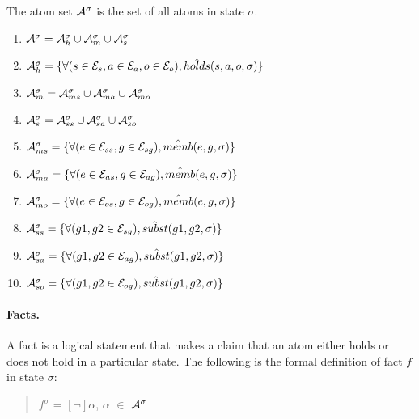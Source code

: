 \documentclass[10pt, twocolumn]{article}
\begin{document}
          The atom set ${\cal A}^{\sigma}$ is the set of all atoms in state
          $\sigma$. 

          \begin{enumerate}
            \item
              ${\cal A}^{\sigma} = {\cal A}^{\sigma}_{h} \cup {\cal A}^{\sigma}_{m} \cup {\cal A}^{\sigma}_{s}$
            \item
              ${\cal A}^{\sigma}_{h} = \{\forall (s \in {\cal E}_{s}, a \in {\cal E}_{a}, o \in {\cal E}_{o}), \hat{holds}(s, a, o, \sigma) \}$
            \item
              ${\cal A}^{\sigma}_{m} = {\cal A}^{\sigma}_{ms} \cup {\cal A}^{\sigma}_{ma} \cup {\cal A}^{\sigma}_{mo}$
            \item
              ${\cal A}^{\sigma}_{s} = {\cal A}^{\sigma}_{ss} \cup {\cal A}^{\sigma}_{sa} \cup {\cal A}^{\sigma}_{so}$
            \item
              ${\cal A}^{\sigma}_{ms} = \{\forall (e \in {\cal E}_{ss}, g \in {\cal E}_{sg}), \hat{memb}(e, g, \sigma)\}$
            \item
              ${\cal A}^{\sigma}_{ma} = \{\forall (e \in {\cal E}_{as}, g \in {\cal E}_{ag}), \hat{memb}(e, g, \sigma)\}$
            \item
              ${\cal A}^{\sigma}_{mo} = \{\forall (e \in {\cal E}_{os}, g \in {\cal E}_{og}), \hat{memb}(e, g, \sigma)\}$
            \item
              ${\cal A}^{\sigma}_{ss} = \{\forall (g1, g2 \in {\cal E}_{sg}), \hat{subst}(g1, g2, \sigma)\}$
            \item
              ${\cal A}^{\sigma}_{sa} = \{\forall (g1, g2 \in {\cal E}_{ag}), \hat{subst}(g1, g2, \sigma)\}$
            \item
              ${\cal A}^{\sigma}_{so} = \{\forall (g1, g2 \in {\cal E}_{og}), \hat{subst}(g1, g2, \sigma)\}$
          \end{enumerate}

        \paragraph{Facts.}
       
          A fact is a logical statement that makes a claim that an atom either
          holds or does not hold in a particular state. The following is the
          formal definition of fact $f$ in state $\sigma$:

          \begin{quote}
            $f^{\sigma}$ = $[\lnot]$$\alpha$, $\alpha$ $\in$ ${\cal A}^{\sigma}$
          \end{quote}
\end{document}
